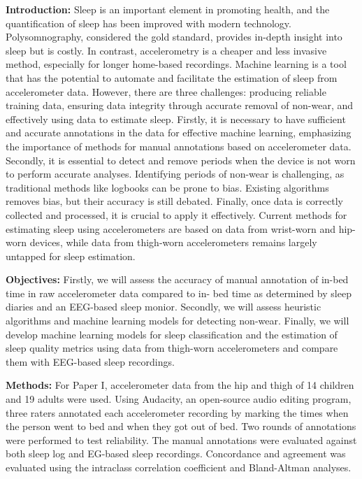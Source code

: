 \documentclass[
  10pt,
]{scrbook}
\let\originaltextbf\textbf
\renewcommand{\textbf}[1]{\textcolor{color1}{\originaltextbf{#1}}}
\begin{document}
\textbf{Introduction:} Sleep is an important element in promoting
health, and the quantification of sleep has been improved with modern
technology. Polysomnography, considered the gold standard, provides
in-depth insight into sleep but is costly. In contrast, accelerometry is
a cheaper and less invasive method, especially for longer home-based
recordings. Machine learning is a tool that has the potential to
automate and facilitate the estimation of sleep from accelerometer data.
However, there are three challenges: producing reliable training data,
ensuring data integrity through accurate removal of non-wear, and
effectively using data to estimate sleep. Firstly, it is necessary to
have sufficient and accurate annotations in the data for effective
machine learning, emphasizing the importance of methods for manual
annotations based on accelerometer data. Secondly, it is essential to
detect and remove periods when the device is not worn to perform
accurate analyses. Identifying periods of non-wear is challenging, as
traditional methods like logbooks can be prone to bias. Existing
algorithms removes bias, but their accuracy is still debated. Finally,
once data is correctly collected and processed, it is crucial to apply
it effectively. Current methods for estimating sleep using
accelerometers are based on data from wrist-worn and hip-worn devices,
while data from thigh-worn accelerometers remains largely untapped for
sleep estimation.

\textbf{Objectives:} Firstly, we will assess the accuracy of manual
annotation of in-bed time in raw accelerometer data compared to in- bed
time as determined by sleep diaries and an EEG-based sleep monior.
Secondly, we will assess heuristic algorithms and machine learning
models for detecting non-wear. Finally, we will develop machine learning
models for sleep classification and the estimation of sleep quality
metrics using data from thigh-worn accelerometers and compare them with
EEG-based sleep recordings.

\textbf{Methods:} For Paper I, accelerometer data from the hip and thigh
of 14 children and 19 adults were used. Using Audacity, an open-source
audio editing program, three raters annotated each accelerometer
recording by marking the times when the person went to bed and when they
got out of bed. Two rounds of annotations were performed to test
reliability. The manual annotations were evaluated against both sleep
log and EG-based sleep recordings. Concordance and agreement was
evaluated using the intraclass correlation coefficient and Bland-Altman
analyses.
\end{document}
